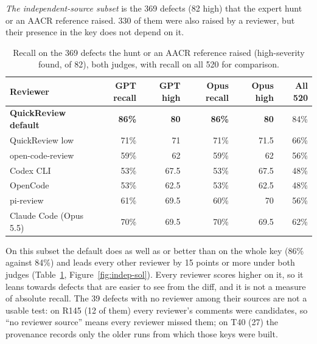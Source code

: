\documentclass[11pt,a4paper]{article}
\newcommand{\qcr}{QuickReview}
\begin{document}
\emph{The independent-source subset} is the 369 defects (82 high) that the
expert hunt or an AACR reference raised. 330 of them were also raised by a
reviewer, but their presence in the key does not depend on it.

\begin{table}[tbp]
  \centering
  \caption{Recall on the 369 defects the hunt or an AACR reference raised
  (high-severity found, of 82), both judges, with recall on all 520 for
  comparison.}
  \label{tab:indep-sol}
  \begin{tabular}{lrrrrr}
    \toprule
    Reviewer & GPT recall & GPT high & Opus recall & Opus high & All 520 \\
    \midrule
    \textbf{\qcr{} default} & \textbf{86\%} & \textbf{80} & \textbf{86\%} & \textbf{80} & 84\% \\
    \qcr{} low & 71\% & 71 & 71\% & 71.5 & 66\% \\
    open-code-review & 59\% & 62 & 59\% & 62 & 56\% \\
    Codex CLI & 53\% & 67.5 & 53\% & 67.5 & 48\% \\
    OpenCode & 53\% & 62.5 & 53\% & 62.5 & 48\% \\
    pi-review & 61\% & 69.5 & 60\% & 70 & 56\% \\
    Claude Code (Opus 5.5) & 70\% & 69.5 & 70\% & 69.5 & 62\% \\
    \bottomrule
  \end{tabular}
\end{table}

On this subset the default does as well as or better than on the whole key
(86\% against 84\%) and leads every other reviewer by 15 points or more under
both judges (Table~\ref{tab:indep-sol}, Figure~\ref{fig:indep-sol}). Every
reviewer scores higher on it, so it leans towards defects that are easier to
see from the diff, and it is not a measure of absolute recall. The 39 defects
with no reviewer among their sources are not a usable test: on R145 (12 of
them) every reviewer's comments were candidates, so ``no reviewer source''
means every reviewer missed them; on T40 (27) the provenance records only the
older runs from which those keys were built.
\end{document}
